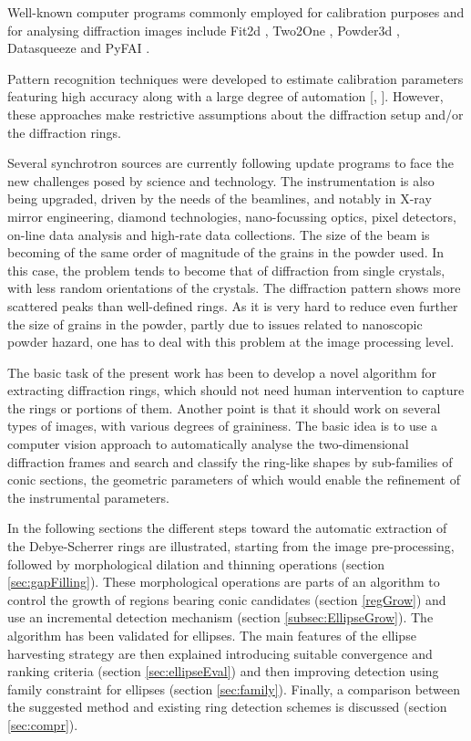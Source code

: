 \documentclass[preprint]{iucr}              %
\begin{document}
Well-known computer programs commonly employed for calibration purposes and for analysing diffraction images include Fit2d \cite{hammersley2016fit2d}, Two2One \cite{vogel2005two2one}, Powder3d 
\cite{hinrichsen2006powder3d}, Datasqueeze \cite{heiney2005software} and PyFAI \cite{kieffer2013pyfai}.

Pattern recognition techniques were developed to estimate calibration parameters featuring high accuracy along with a large degree of automation [\cite{rajiv2007automatic}, \cite{cervellino2006folding}]. However, these approaches make restrictive assumptions about the diffraction setup and/or the diffraction rings.

Several synchrotron sources are currently following update programs to face the new challenges posed by science and technology. The instrumentation is also being upgraded, driven by the needs of the beamlines, and notably in X-ray mirror engineering, diamond technologies, nano-focussing optics, pixel detectors, on-line data analysis and high-rate data collections. The size of the beam is becoming of the same order of magnitude of the grains in the powder used. In this case, the problem tends to become that of diffraction from single crystals, with less random orientations of the crystals. The diffraction pattern shows more scattered peaks than well-defined rings. As it is very hard to reduce even further the size of grains in the powder, partly due to issues related to nanoscopic powder hazard, one has to deal with this problem at the image processing level.

The basic task of the present work has been to develop a novel algorithm for extracting diffraction rings, which should not need human intervention to capture the rings or portions of them. Another point is that it should work on several types of images, with various degrees of graininess. 
The basic idea is to use a computer vision approach to automatically analyse the two-dimensional diffraction frames and search and classify the ring-like shapes by sub-families of conic sections, the geometric parameters of which would enable the refinement of the instrumental parameters.

In the following sections the different steps toward the automatic extraction of the Debye-Scherrer rings are illustrated, starting from the image pre-processing, followed by morphological dilation and thinning operations (section \ref{sec:gapFilling}). These morphological operations are parts of an algorithm to control the growth of regions bearing conic candidates (section \ref{regGrow}) and use an incremental detection mechanism (section \ref{subsec:EllipseGrow}). The algorithm has been validated for ellipses. The main features of the ellipse harvesting strategy are then explained introducing suitable convergence and ranking criteria (section \ref{sec:ellipseEval}) and then improving detection using family constraint for ellipses (section \ref{sec:family}). Finally, a comparison between the suggested method and existing ring detection schemes is discussed (section \ref{sec:compr}).
\end{document}
